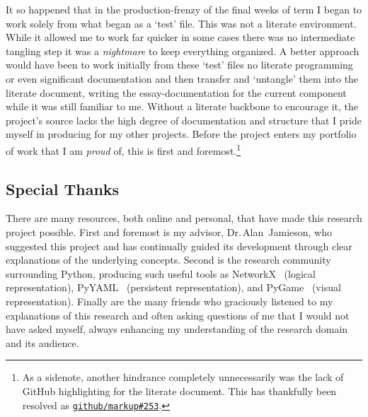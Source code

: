 It so happened that \Dash in the production-frenzy of the final weeks of term \Dash
  I began to work solely from what began as a \enquote*{test} file.
This was not a literate environment.
While it allowed me to work far quicker in some cases
  \Dash there was no intermediate tangling step \Dash
  it was a \emph{nightmare} to keep everything organized.
A better approach would have been to work initially from these \enquote*{test} files \Dash
  no literate programming or even significant documentation \Dash
  and then transfer and \enquote*{untangle} them into the literate document,
  writing the essay-documentation for the current component while it was still familiar to me.
Without a literate backbone to encourage it, the project's source lacks the high degree of
  documentation and structure that I pride myself in producing for my other projects.
Before the project enters my portfolio of work that I am \emph{proud} of,
  this is first and foremost.\footnote{As a sidenote,
    another hindrance \Dash completely unnecessarily \Dash
    was the lack of GitHub highlighting for the literate document.
    This has thankfully been resolved as \href{https://github.com/github/markup/issues/253}{\texttt{github/markup\#253}}.}

\subsection{Special Thanks}
There are many resources, both online and personal, that have made this research project possible.
First and foremost is my advisor, Dr.\,Alan~Jamieson, who suggested this project
  and has continually guided its development through clear explanations of the underlying concepts.
Second is the research community surrounding Python, producing such useful tools
  as NetworkX~\autocite{hagberg:networkx} (logical representation),
  PyYAML~\autocite{pyyaml} (persistent representation), and
  PyGame~\autocite{pygame} (visual representation).
Finally are the many friends who graciously listened to my explanations of this research
  and often asking questions of me that I would not have asked myself,
  always enhancing my understanding of the research domain and its audience.

